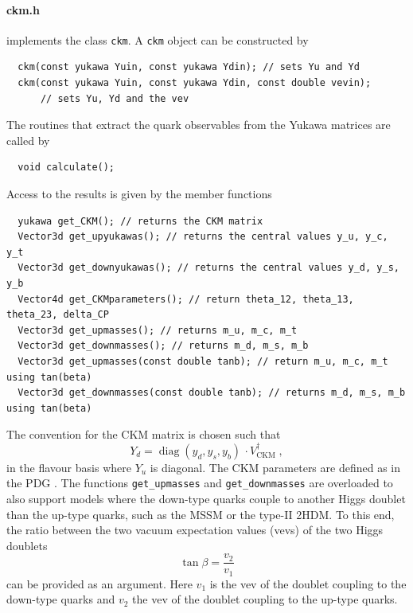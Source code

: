 \documentclass[preprint,12pt]{elsarticle}
\begin{document}
\paragraph{ckm.h}
implements the class \texttt{ckm}.
A \texttt{ckm} object can be constructed by
\begin{lstlisting}
  ckm(const yukawa Yuin, const yukawa Ydin); // sets Yu and Yd
  ckm(const yukawa Yuin, const yukawa Ydin, const double vevin);
      // sets Yu, Yd and the vev
\end{lstlisting}
The routines that extract the quark observables from the Yukawa matrices are called by
\begin{lstlisting}
  void calculate();
\end{lstlisting}
Access to the results is given by the member functions
\begin{lstlisting}
  yukawa get_CKM(); // returns the CKM matrix
  Vector3d get_upyukawas(); // returns the central values y_u, y_c, y_t
  Vector3d get_downyukawas(); // returns the central values y_d, y_s, y_b
  Vector4d get_CKMparameters(); // return theta_12, theta_13, theta_23, delta_CP
  Vector3d get_upmasses(); // returns m_u, m_c, m_t
  Vector3d get_downmasses(); // returns m_d, m_s, m_b
  Vector3d get_upmasses(const double tanb); // return m_u, m_c, m_t using tan(beta)
  Vector3d get_downmasses(const double tanb); // returns m_d, m_s, m_b using tan(beta)
\end{lstlisting}
The convention for the CKM matrix is chosen such that
\begin{equation}
  Y_d = \operatorname{diag}(y_d,y_s,y_b)\,\cdot V_{\mathrm{CKM}}^\dagger\;,
\end{equation}
in the flavour basis where $Y_u$ is diagonal. The CKM parameters are defined as in the PDG \cite{Patrignani:2016xqp}.
The functions \verb|get_upmasses| and \verb|get_downmasses| are overloaded to also support models where the down-type quarks couple to another Higgs doublet than the up-type quarks,
such as the MSSM or the type-II 2HDM. To this end, the ratio between the two vacuum expectation values (vevs) of the two Higgs doublets
\begin{equation}
\tan\beta = \frac{v_2}{v_1}
\end{equation}
can be provided as an argument. Here $v_1$ is the vev of the doublet coupling to the down-type quarks and $v_2$ the vev of the doublet coupling to the up-type quarks.
\end{document}
